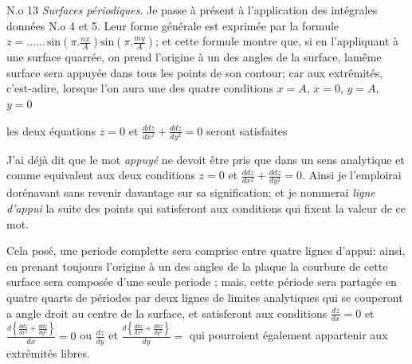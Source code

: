 \documentclass[11pt,a4paper]{article}
\begin{document}
N.o 13 \emph{Surfaces périodiques}. Je passe à présent à l'application
des intégrales données N.o 4 et 5. Leur forme générale est exprimée
par la formule $z = \ldots\ldots\,\text{sin}\left(\pi.\frac{nx}{A}\right)\text{sin}\left(\pi.\frac{my}{A}\right)$; et cette formule
montre que, si en l'appliquant à une surface quarrée, on prend
l'origine à un des angles de la surface, lamême surface sera
appuyée dans tous les points de son contour; car aux extrêmités,
c'est-adire, lorsque  l'on aura une
des quatre conditions $x=A$, $x=0$, $y=A$, $y=0$


les deux équations $z=0$ et $\frac{ddz}{dx^2}+\frac{ddz}{dy^2}=0$ seront satisfaites

J'ai déjà dit que le mot \emph{appuyé} ne devoit être pris
que dans un sens analytique et comme equivalent aux
deux conditions $z=0$ et $\frac{ddz}{dx^2}+\frac{ddz}{dy^2}=0$. Ainsi je l'emploirai
dorénavant sans revenir davantage sur sa signification; et je
nommerai \emph{ligne d'appui} la suite des points qui satisferont
aux conditions qui  fixent la valeur de ce mot.

Cela posé, une periode complette sera comprise entre quatre
lignes d'appui: ainsi, en prenant toujours l'origine à un des
angles de la plaque la courbure de cette surface sera
composée d'une seule periode ;
mais,  cette période sera partagée en quatre quarts de
périodes par deux lignes de limites analytiques qui se couperont
a angle droit au centre de la surface, et satisferont aux
conditions $\frac{dz}{dx}=0$ et $\frac{d\left\{\frac{ddz}{dx^2}+\frac{ddz}{dy^2}\right\}}{dx}=0$ ou $\frac{dz}{dy}$ et $\frac{d\left\{\frac{ddz}{dx^2}+\frac{ddz}{dy^2}\right\}}{dy}=$
qui pourroient également appartenir aux extrêmités libres.
\end{document}
